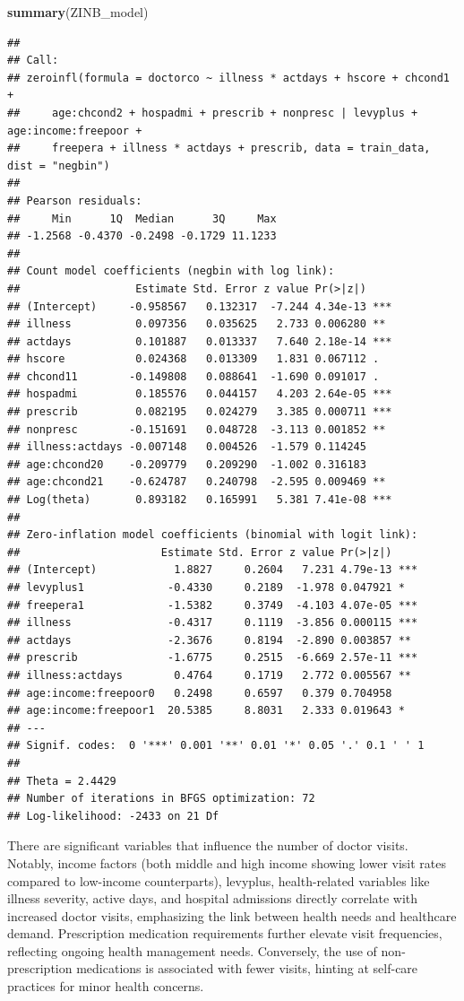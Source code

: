 \documentclass[
]{article}
\newenvironment{Shaded}{\begin{snugshade}}{\end{snugshade}}
\newcommand{\FunctionTok}[1]{\textcolor[rgb]{0.13,0.29,0.53}{\textbf{#1}}}
\newcommand{\NormalTok}[1]{#1}
\begin{document}
\begin{Shaded}
\begin{Highlighting}[]
\FunctionTok{summary}\NormalTok{(ZINB\_model)}
\end{Highlighting}
\end{Shaded}

\begin{verbatim}
## 
## Call:
## zeroinfl(formula = doctorco ~ illness * actdays + hscore + chcond1 + 
##     age:chcond2 + hospadmi + prescrib + nonpresc | levyplus + age:income:freepoor + 
##     freepera + illness * actdays + prescrib, data = train_data, dist = "negbin")
## 
## Pearson residuals:
##     Min      1Q  Median      3Q     Max 
## -1.2568 -0.4370 -0.2498 -0.1729 11.1233 
## 
## Count model coefficients (negbin with log link):
##                  Estimate Std. Error z value Pr(>|z|)    
## (Intercept)     -0.958567   0.132317  -7.244 4.34e-13 ***
## illness          0.097356   0.035625   2.733 0.006280 ** 
## actdays          0.101887   0.013337   7.640 2.18e-14 ***
## hscore           0.024368   0.013309   1.831 0.067112 .  
## chcond11        -0.149808   0.088641  -1.690 0.091017 .  
## hospadmi         0.185576   0.044157   4.203 2.64e-05 ***
## prescrib         0.082195   0.024279   3.385 0.000711 ***
## nonpresc        -0.151691   0.048728  -3.113 0.001852 ** 
## illness:actdays -0.007148   0.004526  -1.579 0.114245    
## age:chcond20    -0.209779   0.209290  -1.002 0.316183    
## age:chcond21    -0.624787   0.240798  -2.595 0.009469 ** 
## Log(theta)       0.893182   0.165991   5.381 7.41e-08 ***
## 
## Zero-inflation model coefficients (binomial with logit link):
##                      Estimate Std. Error z value Pr(>|z|)    
## (Intercept)            1.8827     0.2604   7.231 4.79e-13 ***
## levyplus1             -0.4330     0.2189  -1.978 0.047921 *  
## freepera1             -1.5382     0.3749  -4.103 4.07e-05 ***
## illness               -0.4317     0.1119  -3.856 0.000115 ***
## actdays               -2.3676     0.8194  -2.890 0.003857 ** 
## prescrib              -1.6775     0.2515  -6.669 2.57e-11 ***
## illness:actdays        0.4764     0.1719   2.772 0.005567 ** 
## age:income:freepoor0   0.2498     0.6597   0.379 0.704958    
## age:income:freepoor1  20.5385     8.8031   2.333 0.019643 *  
## ---
## Signif. codes:  0 '***' 0.001 '**' 0.01 '*' 0.05 '.' 0.1 ' ' 1 
## 
## Theta = 2.4429 
## Number of iterations in BFGS optimization: 72 
## Log-likelihood: -2433 on 21 Df
\end{verbatim}

There are significant variables that influence the number of doctor
visits. Notably, income factors (both middle and high income showing
lower visit rates compared to low-income counterparts), levyplus,
health-related variables like illness severity, active days, and
hospital admissions directly correlate with increased doctor visits,
emphasizing the link between health needs and healthcare demand.
Prescription medication requirements further elevate visit frequencies,
reflecting ongoing health management needs. Conversely, the use of
non-prescription medications is associated with fewer visits, hinting at
self-care practices for minor health concerns.
\end{document}
